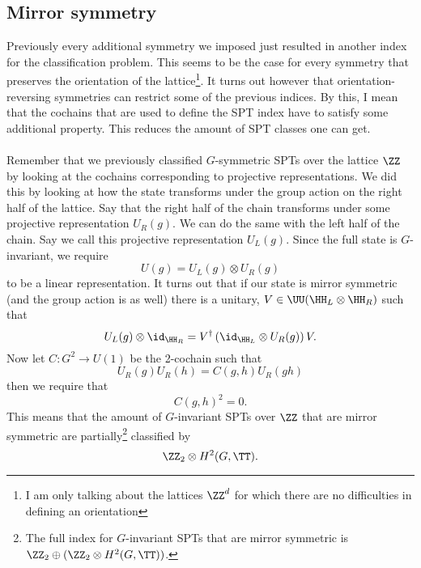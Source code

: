 \subsection{Mirror symmetry}
Previously every additional symmetry we imposed just resulted in another index for the classification problem. This seems to be the case for every symmetry that preserves the orientation of the lattice\footnote{I am only talking about the lattices $\ZZ^d$ for which there are no difficulties in defining an orientation}. It turns out however that orientation-reversing symmetries can restrict some of the previous indices. By this, I mean that the cochains that are used to define the SPT index have to satisfy some additional property. This reduces the amount of SPT classes one can get.
\\\\
Remember that we previously classified $G$-symmetric SPTs over the lattice $\ZZ$ by looking at the cochains corresponding to projective representations. We did this by looking at how the state transforms under the group action on the right half of the lattice. Say that the right half of the chain transforms under some projective representation $U_R(g)$. We can do the same with the left half of the chain. Say we call this projective representation $U_L(g)$. Since the full state is $G$-invariant, we require
\begin{equation}
U(g)=U_L(g)\otimes U_R(g)
\end{equation}
to be a linear representation. It turns out that if our state is mirror symmetric (and the group action is as well) there is a unitary, $V\in\UU(\HH_L\otimes\HH_R)$ such that
\begin{equation}
U_L(g)\otimes\id_{\HH_R}=V^\dagger \left(\id_{\HH_L}\otimes U_R(g)\right)V.
\end{equation}
Now let $C:G^2\rightarrow U(1)$ be the 2-cochain such that
\begin{equation}
U_R(g)U_R(h)=C(g,h)U_R(gh)
\end{equation}
then we require that
\begin{equation}
C(g,h)^2=0.
\end{equation}
This means that the amount of $G$-invariant SPTs over $\ZZ$ that are mirror symmetric are partially\footnote{The full index for $G$-invariant SPTs that are mirror symmetric is $\ZZ_2\oplus (\ZZ_2\otimes H^2(G,\TT))$.} classified by
\begin{equation}
\ZZ_2\otimes H^2(G,\TT).
\end{equation}



\cleardoublepage

